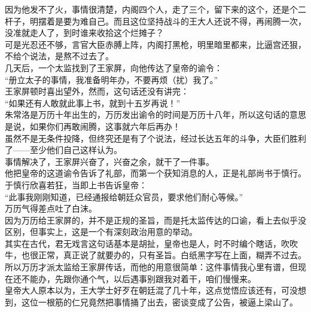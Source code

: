 \begin{multicols}{\theparacolNo}
因为他发不了火，事情很清楚，内阁四个人，走了三个，留下来的这个，还是个二杆子，明摆着是要为难自己。而且这位坚持战斗的王大人还说不得，再闹腾一次，没准就走人了，到时谁来收拾这个烂摊子？\\

可是光忍还不够，言官大臣赤膊上阵，内阁打黑枪，明里暗里都来，比逼宫还狠，不给个说法，是熬不过去了。\\

几天后，一个太监找到了王家屏，向他传达了皇帝的谕令：\\

“册立太子的事情，我准备明年办，不要再烦（扰）我了。”\\

王家屏顿时喜出望外，然而，这句话还没有讲完：\\

“如果还有人敢就此事上书，就到十五岁再说！”\\

朱常洛是万历十年出生的，万历发出谕令的时间是万历十八年，所以这句话的意思是说，如果你们再敢闹腾，这事就六年后再办！\\

虽然不是无条件投降，但终究还是有了个说法，经过长达五年的斗争，大臣们胜利了——至少他们自己这样认为。\\

事情解决了，王家屏兴奋了，兴奋之余，就干了一件事。\\

他把皇帝的这道谕令告诉了礼部，而第一个获知消息的人，正是礼部尚书于慎行。\\

于慎行欣喜若狂，当即上书告诉皇帝：\\

“此事我刚刚知道，已经通报给朝廷众官员，要求他们耐心等候。”\\

万历气得差点吐了白沫。\\

因为万历给王家屏的，并不是正规的圣旨，而是托太监传达的口谕，看上去似乎没区别，但事实上，这是一个有深刻政治用意的举动。\\

其实在古代，君无戏言这句话基本是胡扯，皇帝也是人，时不时编个瞎话，吹吹牛，也很正常，真正说了就要办的，只有圣旨。白纸黑字写在上面，糊弄不过去。所以万历才派太监给王家屏传话，而他的用意很简单：这件事情我心里有谱，但现在还不能办，先跟你通个气，以后遇事别跟我对着干，咱们慢慢来。\\

皇帝大人原本以为，王大学士好歹在朝廷混了几十年，这点觉悟应该还有，可没想到，这位一根筋的仁兄竟然把事情捅了出去，密谈变成了公告，被逼上梁山了。\\


\end{multicols}
